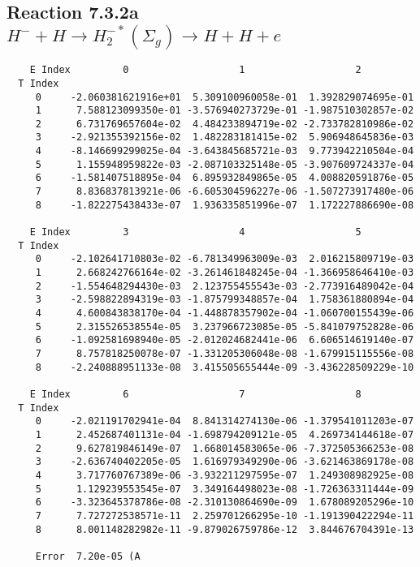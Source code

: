 \documentclass[12pt]{article}
\begin{document}
                               


\newpage
\subsection{
Reaction 7.3.2a $  H^- + H \rightarrow H_2^{-*}(\Sigma_g) \rightarrow H + H + e$}


\begin{small}\begin{verbatim}
    E Index         0                   1                   2
  T Index
     0     -2.060381621916e+01  5.309100960058e-01  1.392829074695e-01
     1      7.588123099350e-01 -3.576940273729e-01 -1.987510302857e-02
     2      6.731769657604e-02  4.484233894719e-02 -2.733782810986e-02
     3     -2.921355392156e-02  1.482283181415e-02  5.906948645836e-03
     4     -8.146699299025e-04 -3.643845685721e-03  9.773942210504e-04
     5      1.155948959822e-03 -2.087103325148e-05 -3.907609724337e-04
     6     -1.581407518895e-04  6.895932849865e-05  4.008820591876e-05
     7      8.836837813921e-06 -6.605304596227e-06 -1.507273917480e-06
     8     -1.822275438433e-07  1.936335851996e-07  1.172227886690e-08

    E Index         3                   4                   5
  T Index
     0     -2.102641710803e-02 -6.781349963009e-03  2.016215809719e-03
     1      2.668242766164e-02 -3.261461848245e-04 -1.366958646410e-03
     2     -1.554648294430e-03  2.123755455543e-03 -2.773916489042e-04
     3     -2.598822894319e-03 -1.875799348857e-04  1.758361880894e-04
     4      4.600843838170e-04 -1.448878357902e-04 -1.060700155439e-06
     5      2.315526538554e-05  3.237966723085e-05 -5.841079752828e-06
     6     -1.092581698940e-05 -2.012024682441e-06  6.606514619140e-07
     7      8.757818250078e-07 -1.331205306048e-08 -1.679915115556e-08
     8     -2.240888951133e-08  3.415505655444e-09 -3.436228509229e-10

    E Index         6                   7                   8
  T Index
     0     -2.021191702941e-04  8.841314274130e-06 -1.379541011203e-07
     1      2.452687401131e-04 -1.698794209121e-05  4.269734144618e-07
     2      9.627819846149e-07  1.668014583065e-06 -7.372505366253e-08
     3     -2.636740402205e-05  1.616979349290e-06 -3.621463869178e-08
     4      3.717760767389e-06 -3.932211297595e-07  1.249308982925e-08
     5      1.129239553545e-07  3.349164498023e-08 -1.726363311444e-09
     6     -3.323645378786e-08 -2.310130864690e-09  1.678089205296e-10
     7      7.727272538571e-11  2.259701266295e-10 -1.191390422294e-11
     8      8.001148282982e-11 -9.879026759786e-12  3.844676704391e-13

     Error  7.20e-05 (A
\end{verbatim}\end{small}
\end{document}
